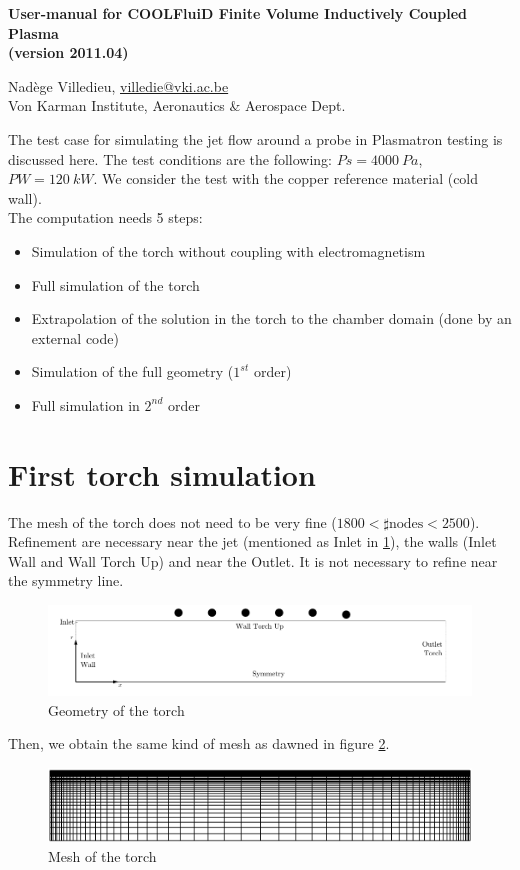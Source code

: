 \documentclass[11pt]{article}
\begin{document}
\pagestyle{empty}

\begin{center}
  {\fontsize{14}{20}\bf 
    User-manual for COOLFluiD Finite Volume Inductively Coupled Plasma \\
    (version 2011.04) \\[10pt]}
\end{center}

\begin{center}
  {Nad\`{e}ge Villedieu, \underline{villedie@vki.ac.be} \\
    Von Karman Institute, Aeronautics \& Aerospace Dept.}
\end{center}

The test case for simulating the jet flow around a probe in Plasmatron testing is discussed here. 
The test conditions are the following: $Ps = 4000 ~Pa$, $PW=120~kW$.
We consider the test with the copper reference material (cold wall). \\ 
The computation needs 5 steps:
\begin{itemize}
\item Simulation of the torch without coupling with electromagnetism
\item Full simulation of the torch
\item Extrapolation of the solution in the torch to the chamber domain (done by an external code)
\item Simulation of the full geometry ($1^{st}$ order)
\item Full simulation in $2^{nd}$ order
\end{itemize}

\section{First torch simulation}
The mesh of the torch does not need to be very fine ($1800<\sharp \textrm{nodes}<2500$). 
Refinement are necessary near the jet (mentioned as Inlet in \ref{fig:geomtorch}),
the walls (Inlet Wall and Wall Torch Up) and near the Outlet. 
It is not necessary to refine near the symmetry line.
\begin{figure}[htbp]
  \includegraphics[width=\textwidth]{geom_torch.pdf}
\caption{Geometry of the torch}\label{fig:geomtorch}
\end{figure}
Then, we obtain the same kind of mesh as dawned in figure \ref{fig:meshtorch}.
\begin{figure}[hbp]
  \includegraphics[width=\textwidth]{mesh_torch_3.png}
  \caption{Mesh of the torch}\label{fig:meshtorch}
\end{figure}
\end{document}

